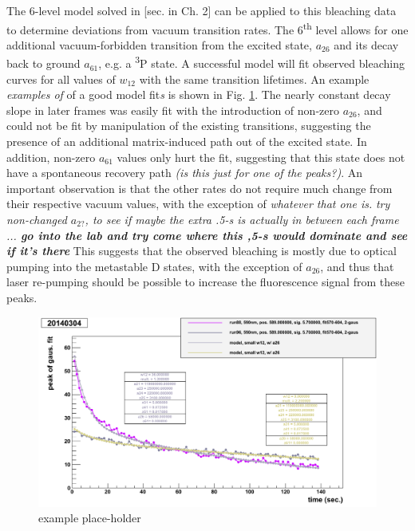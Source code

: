 
The 6-level model solved in [sec. in Ch. 2] can be applied to this bleaching data to determine deviations from vacuum transition rates.  The 6\textsuperscript{th} level allows for one additional vacuum-forbidden transition from the excited state, $a_{26}$ and its decay back to ground $a_{61}$, e.g. a \textsuperscript{3}P state.  A successful model will fit observed bleaching curves for all values of $w_{12}$ with the same transition lifetimes.  An example \emph{\color{gray}examples of} of a good model fit\emph{\color{gray}s} is shown in Fig. \ref{fig:bleachModel}.   The nearly constant decay slope in later frames was easily fit with the introduction of non-zero $a_{26}$, and could not be fit by manipulation of the existing transitions, suggesting the presence of an additional matrix-induced path out of the excited state. In addition, non-zero $a_{61}$ values only hurt the fit, suggesting that this state does not have a spontaneous recovery path  \emph{\color{gray}(is this just for one of the peaks?)}.  An important observation is that the other rates do not require much change from their respective vacuum values, with the exception of \emph{\color{gray}whatever that one is.}  \emph{try non-changed $a_{2?}$, to see if maybe the extra .5-s is actually in between each frame ... \textbf{go into the lab and try come where this ,5-s would dominate and see if it's there}}  This suggests that the observed bleaching is mostly due to optical pumping into the metastable D states, with the exception of $a_{26}$, and thus that laser re-pumping should be possible to increase the fluorescence signal from these peaks.

\begin{figure} %
        \centering
                \includegraphics[width=.7\textwidth]{figures/model_smallw12_a26_run96and88_close.png}
                \caption{\color{red}example place-holder}
\label{fig:bleachModel}
\end{figure}

